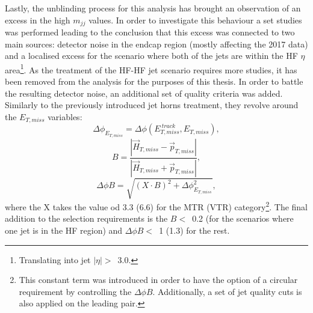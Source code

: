 \hspace{10pt} Lastly, the unblinding process for this analysis has brought an observation of an excess in the high $m_{jj}$ values. In order to investigate this behaviour a set studies was performed leading to the conclusion that this excess was connected to two main sources: detector noise in the endcap region (mostly affecting the 2017 data) and a localised excess for the scenario where both of the jets are within the HF $\eta$ area\footnote{Translating into jet $|\eta|>$~3.0.}. As the treatment of the HF-HF jet scenario requires more studies, it has been removed from the analysis for the purposes of this thesis. In order to battle the resulting detector noise, an additional set of quality criteria was added. Similarly to the previously introduced jet horns treatment, they revolve around the $E_{T,miss}$ variables:
\begin{equation}
    \Delta\phi_{E_{T,miss}} = \Delta\phi(E_{T,miss}^{~track}, E_{T, miss}),
\end{equation}
\begin{equation}
    B = \frac{|\vec{H}_{T,miss}-\vec{p}_{T,miss}|}{|\vec{H}_{T,miss}+\vec{p}_{T,miss}|},
\end{equation}
\begin{equation}
    \Delta\phi B = \sqrt{(X\cdot B)^2+\Delta\phi_{E_{T,miss}}^2},
\end{equation}
where the X takes the value od 3.3 (6.6) for the MTR (VTR) category\footnote{This constant term was introduced in order to have the option of a circular requirement by controlling the $\Delta\phi B$. Additionally, a set of jet quality cuts is also applied on the leading pair.}. The final addition to the selection requirements is the $B<$~0.2 (for the scenarios where one jet is in the HF region) and $\Delta\phi B <$~1 (1.3) for the rest.

